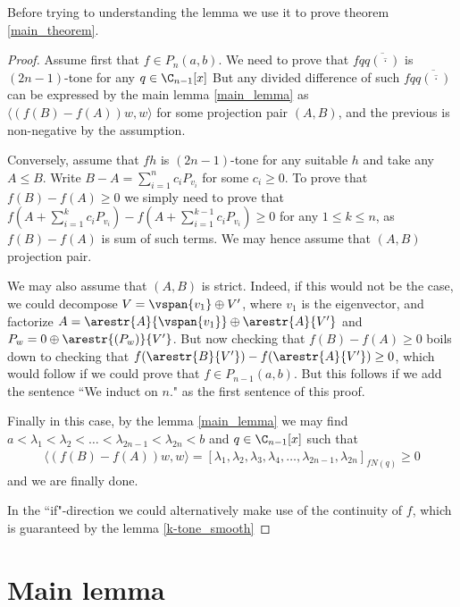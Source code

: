 Before trying to understanding the lemma we use it to prove theorem \ref{main_theorem}.

\begin{proof}
	Assume first that $f \in P_{n}(a, b)$. We need to prove that $f q \overline{q(\overline{\cdot})}$ is $(2 n - 1)$-tone for any $q \in \C_{n - 1}[x]$ But any divided difference of such $f q \overline{q(\overline{\cdot})}$ can be expressed by the main lemma \ref{main_lemma} as $\langle (f(B) - f(A)) w, w \rangle$ for some projection pair $(A, B)$, and the previous is non-negative by the assumption.

	Conversely, assume that $f h$ is $(2 n - 1)$-tone for any suitable $h$ and take any $A \leq B$. Write $B - A = \sum_{i = 1}^{n} c_{i} P_{v_{i}}$ for some $c_{i} \geq 0$. To prove that $f(B) - f(A) \geq 0$ we simply need to prove that $f(A + \sum_{i = 1}^{k} c_{i} P_{v_{i}}) - f(A + \sum_{i = 1}^{k - 1} c_{i} P_{v_{i}}) \geq 0$ for any $1 \leq k \leq n$, as $f(B) - f(A)$ is sum of such terms. We may hence assume that $(A, B)$ projection pair.

	We may also assume that $(A, B)$ is strict. Indeed, if this would not be the case, we could decompose $V = \vspan\{v_{1}\} \oplus V'$, where $v_{1}$ is the eigenvector, and factorize $A = \arestr{A}{\vspan\{v_{1}\}} \oplus \arestr{A}{V'}$ and $P_{w} = 0 \oplus \arestr{(P_{w})}{V'}$. But now checking that $f(B) - f(A) \geq 0$ boils down to checking that $f(\arestr{B}{V'}) - f(\arestr{A}{V'}) \geq 0$, which would follow if we could prove that $f \in P_{n - 1}(a, b)$. But this follows if we add the sentence ``We induct on $n$." as the first sentence of this proof.

	Finally in this case, by the lemma \ref{main_lemma} we may find $a < \lambda_{1} < \lambda_{2} < \ldots < \lambda_{2 n - 1} < \lambda_{2 n} < b$ and $q \in \C_{n - 1}[x]$ such that
	\begin{align*}
		\langle (f(B) - f(A)) w, w \rangle = [\lambda_{1}, \lambda_{2}, \lambda_{3}, \lambda_{4}, \ldots, \lambda_{2n - 1}, \lambda_{2 n}]_{f N(q)} \geq 0
	\end{align*}
	and we are finally done.

	In the ``if"-direction we could alternatively make use of the continuity of $f$, which is guaranteed by the lemma \ref{k-tone_smooth}

\end{proof}

\section{Main lemma}

